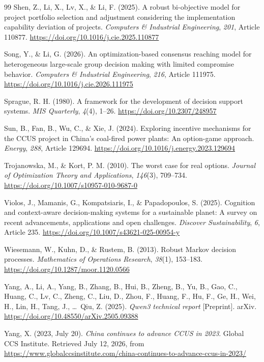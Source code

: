 \begin{thebibliography}{99}
Shen, Z., Li, X., Lv, X., \& Li, F. (2025). A robust bi-objective model for project portfolio selection and adjustment considering the implementation capability deviation of projects. \emph{Computers \& Industrial Engineering}, \emph{201}, Article 110877. \url{https://doi.org/10.1016/j.cie.2025.110877}

Song, Y., \& Li, G. (2026). An optimization-based consensus reaching model for heterogeneous large-scale group decision making with limited compromise behavior. \emph{Computers \& Industrial Engineering}, \emph{216}, Article 111975. \url{https://doi.org/10.1016/j.cie.2026.111975}

Sprague, R. H. (1980). A framework for the development of decision support systems. \emph{MIS Quarterly}, \emph{4}(4), 1--26. \url{https://doi.org/10.2307/248957}

Sun, B., Fan, B., Wu, C., \& Xie, J. (2024). Exploring incentive mechanisms for the CCUS project in China's coal-fired power plants: An option-game approach. \emph{Energy}, \emph{288}, Article 129694. \url{https://doi.org/10.1016/j.energy.2023.129694}

Trojanowska, M., \& Kort, P. M. (2010). The worst case for real options. \emph{Journal of Optimization Theory and Applications}, \emph{146}(3), 709--734. \url{https://doi.org/10.1007/s10957-010-9687-0}

Violos, J., Mamanis, G., Kompatsiaris, I., \& Papadopoulos, S. (2025). Cognition and context-aware decision-making systems for a sustainable planet: A survey on recent advancements, applications and open challenges. \emph{Discover Sustainability}, \emph{6}, Article 235. \url{https://doi.org/10.1007/s43621-025-00954-y}

Wiesemann, W., Kuhn, D., \& Rustem, B. (2013). Robust Markov decision processes. \emph{Mathematics of Operations Research}, \emph{38}(1), 153--183. \url{https://doi.org/10.1287/moor.1120.0566}

Yang, A., Li, A., Yang, B., Zhang, B., Hui, B., Zheng, B., Yu, B., Gao, C., Huang, C., Lv, C., Zheng, C., Liu, D., Zhou, F., Huang, F., Hu, F., Ge, H., Wei, H., Lin, H., Tang, J., \ldots\ Qiu, Z. (2025). \emph{Qwen3 technical report} [Preprint]. arXiv. \url{https://doi.org/10.48550/arXiv.2505.09388}

Yang, X. (2023, July 20). \emph{China continues to advance CCUS in 2023}. Global CCS Institute. Retrieved July 12, 2026, from \url{https://www.globalccsinstitute.com/china-continues-to-advance-ccus-in-2023/}

\end{thebibliography}


